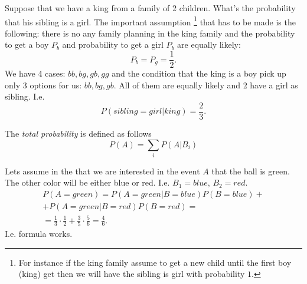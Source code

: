 \begin{example}
Suppose that we have a king from a family of 2 children. What's the
probability that his sibling is a girl. The important assumption
\footnote{
For instance if the king family assume to get a new child until the
first boy (king) get then we will have the sibling is girl with
probability $1$.
}
that
has to be made is the following: there is no any family planning in
the king family and the probability to get a boy $P_b$ and probability
to get a girl $P_b$ are equally likely:
\[
P_b = P_g = \frac{1}{2}.
\] 
We have 4 cases: $bb, bg, gb, gg$ and the condition that the king is a
boy pick up only 3 options for us: $bb, bg, gb$. All of them are
equally likely and 2 have a girl as sibling. I.e.
\[
P(sibling = girl|king) = \frac{2}{3}.
\]
\end{example}

\begin{proposition}

The \textit{total probability} is defined as follows
\[
P(A) = \sum_i P(A|B_i)
\]
\label{thm:totalprobability}
\end{proposition}

\begin{example}
Lets assume in the  that we are
interested in the event $A$ that the ball is green. The other color
will be either blue or red. I.e. $B_1 = blue$, $B_2 = red$.
\begin{eqnarray}
P(A = green) = P(A = green|B = blue) P(B = blue) +
\nonumber \\
+
P(A = green|B = red) P(B = red) =
\nonumber \\
= \frac{1}{3} \cdot \frac{1}{2} + \frac{3}{5}\cdot \frac{5}{6} = \frac{4}{6}.
\nonumber
\end{eqnarray}
I.e. formula works.
\end{example}

